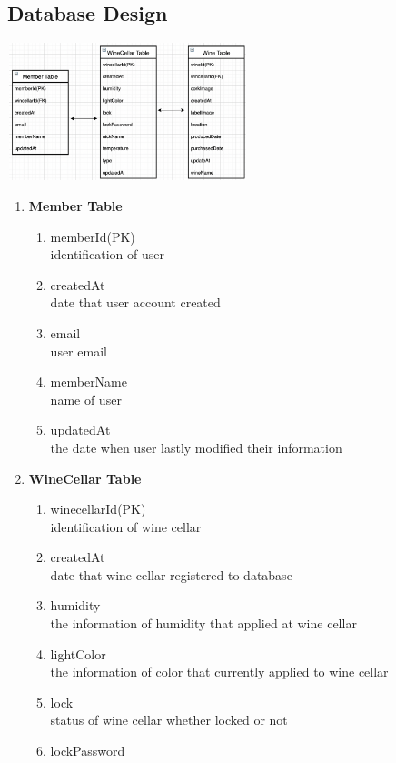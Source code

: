 \documentclass[conference]{IEEEtran}
\numberwithin{figure}{subsection}
\begin{document}
\subsection{Database Design}
\centerline{\includegraphics[width=7cm, height=4cm]{database.png}}
\begin{enumerate}
    \item \textbf{Member Table}
     \begin{enumerate}
        \item memberId(PK)\\
        identification of user
        \item createdAt\\
        date that user account created
        \item email\\
        user email
        \item memberName\\
        name of user
        \item updatedAt\\
        the date when user lastly modified their information
    \end{enumerate}
    \item \textbf{WineCellar Table}
      \begin{enumerate}
        \item     winecellarId(PK)\\
        identification of wine cellar
        \item createdAt\\
        date that wine cellar registered to database
        \item humidity\\
        the information of humidity that applied at wine cellar
        \item lightColor\\
        the information of color that currently applied to wine cellar
        \item lock\\
        status of wine cellar whether locked or not
        \item lockPassword\\

\end{enumerate}
\end{enumerate}
\end{document}
